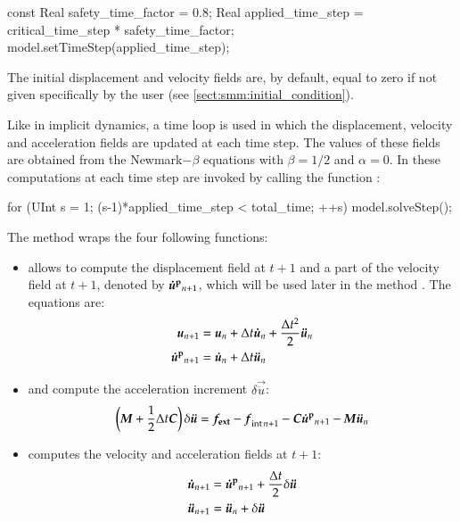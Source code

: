 \begin{cpp}
const Real safety_time_factor = 0.8;
Real applied_time_step = critical_time_step * safety_time_factor;
model.setTimeStep(applied_time_step);
\end{cpp}
 The initial displacement and
velocity fields are, by default, equal to zero if not given
specifically by the user (see \ref{sect:smm:initial_condition}).

Like in implicit dynamics, a time loop is used in which the
displacement, velocity and acceleration fields are updated at each
time step. The values of these fields are obtained from the
Newmark$-\beta$ equations with $\beta=1/2$ and $\alpha=0$. In \akantu
these computations at each time step are invoked by calling the
function :
\begin{cpp}
for (UInt s = 1; (s-1)*applied_time_step < total_time; ++s) {
  model.solveStep();
}
\end{cpp} 
The method
 wraps the four following functions:
\begin{itemize}
\item {} allows to compute the displacement
  field at $t+1$ and a part of the velocity field at $t+1$, denoted by
  $\boldsymbol{\dot{u}^{{\mathrm{p}}}}_{n+1}$, which will be used later in the method
  . The equations are:
  \begin{align}
    \boldsymbol{u}_{n+1} &= \boldsymbol{u}_{n} + \Delta t
    \boldsymbol{\dot{u}}_{n} + \frac{\Delta t^2}{2} \boldsymbol{\ddot{u}}_{n}\\
    \boldsymbol{\dot{u}^{{\mathrm{p}}}}_{n+1} &= \boldsymbol{\dot{u}}_{n} + \Delta t
    \boldsymbol{\ddot{u}}_{n}
    \label{eqn:smm:explicit:onehalfvelocity}
  \end{align}

\item {} and
   compute the acceleration increment
  $\delta \vec{\ddot{u}}$:
  \begin{equation}
    \left(\boldsymbol{M} + \frac{1}{2} \Delta t \boldsymbol{C}\right)
    \delta \boldsymbol{\ddot{u}} = \boldsymbol{f_{{\mathrm{ext}}}} - \boldsymbol{f}_{{\mathrm{int}}\, n+1}
    - \boldsymbol{C} \boldsymbol{\dot{u}^{{\mathrm{p}}}}_{n+1} - \boldsymbol{M} \boldsymbol{\ddot{u}}_{n}
  \end{equation}


\item {} computes the velocity and
  acceleration fields at $t+1$:
  \begin{align}
    \boldsymbol{\dot{u}}_{n+1} &= \boldsymbol{\dot{u}^{{\mathrm{p}}}}_{n+1} + \frac{\Delta t}{2}
    \delta \boldsymbol{\ddot{u}} \\ \boldsymbol{\ddot{u}}_{n+1} &=
    \boldsymbol{\ddot{u}}_{n} + \delta \boldsymbol{\ddot{u}}
  \end{align}
\end{itemize}

